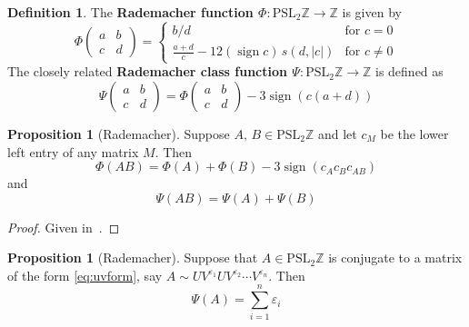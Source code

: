 \documentclass[12pt,twoside]{reedthesis}
\theoremstyle{definition}
\newtheorem{defn}[thm]{Definition}
\newtheorem{prop}[thm]{Proposition}
\newcommand{\Z}{\mathbb{Z}}
\newcommand{\PSLZ}{\mathrm{PSL}_2{\Z}}
\DeclareMathOperator{\sign}{sign}
\newcommand{\defnphrase}[1]{\textbf{#1}}
\begin{document}
\begin{defn}
  The \defnphrase{Rademacher function $\Phi : \PSLZ \to \Z$} is given by
  \begin{equation*}
    \Phi \begin{pmatrix}
      a & b \\
      c & d
    \end{pmatrix} = \begin{cases}
    b/d & \text{for $c = 0$} \\
    \frac{a + d}{c} - 12 (\sign c)\, s(d, |c|) & \text{for $c \neq 0$}
    \end{cases}
  \end{equation*}
  The closely related \defnphrase{Rademacher class function $\Psi : \PSLZ \to \Z$} is defined as
  \begin{equation*}
    \Psi \begin{pmatrix}
      a & b \\ c & d
    \end{pmatrix} = \Phi \begin{pmatrix}
      a & b \\ c & d
    \end{pmatrix} - 3 \sign(c(a + d))
  \end{equation*}
\end{defn}

\begin{prop}[Rademacher]
 Suppose $A,\, B \in \PSLZ$ and let $c_M$ be the lower left entry of any matrix $M$.
 Then
 \begin{equation*}
   \Phi(AB) = \Phi(A) + \Phi(B) - 3 \sign(c_A c_B c_{AB})
 \end{equation*}
 and
 \begin{equation*}
   \Psi(AB) = \Psi(A) + \Psi(B)
 \end{equation*}
\end{prop}

\begin{proof}
  Given in~\cite{rademacher1956}.
\end{proof}

\begin{prop}[Rademacher]\label{prop:rademacher_class_sum}
  Suppose that $A \in \PSLZ$ is conjugate to a matrix of the form \eqref{eq:uvform}, say $A \sim U V^{\varepsilon_1} U V^{\varepsilon_2} \cdots V^{\varepsilon_{n}}$.
  Then
  \begin{equation*}
    \Psi(A) = \sum_{i=1}^n \varepsilon_i
  \end{equation*}
\end{prop}
\end{document}
